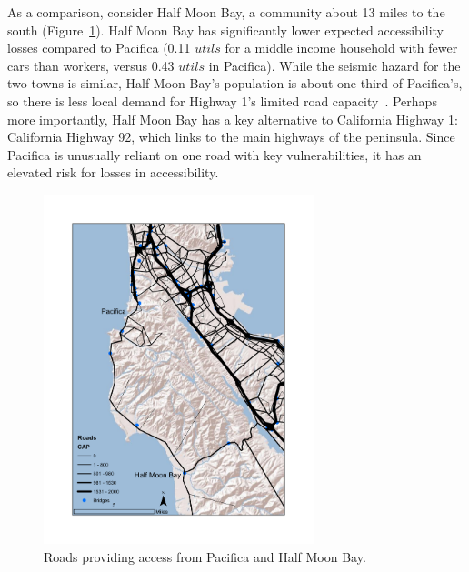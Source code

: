 As a comparison, consider Half Moon Bay, a community about 13 miles to the south (Figure~\ref{fig:pac}). Half Moon Bay has significantly lower expected accessibility losses compared to Pacifica (0.11 $utils$ for a middle income household with fewer cars than workers, versus 0.43 $utils$ in Pacifica). %
While the seismic hazard for the two towns is similar, Half Moon Bay's population is about one third of Pacifica's, so there is less local demand for Highway 1's limited road capacity~\cite{u.s._bureau_of_the_census_united_2010}. Perhaps more importantly, Half Moon Bay has a key alternative to California Highway 1: California Highway 92, which links to the main highways of the peninsula. %
Since Pacifica is unusually reliant on one road with key vulnerabilities, it has an elevated risk for losses in accessibility.
\begin{figure}[!ht]
    \centering
    \includegraphics[height=4in]{FIGS/equity_hmb.pdf} 
\caption{Roads providing access from Pacifica and Half Moon Bay.}
\label{fig:pac}
\end{figure}




